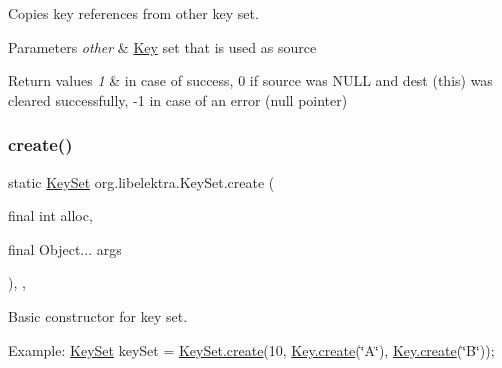 Copies key references from other key set. 


\begin{DoxyParams}{Parameters}
{\em other} & \mbox{\hyperlink{classorg_1_1libelektra_1_1Key}{Key}} set that is used as source \\
\hline
\end{DoxyParams}

\begin{DoxyRetVals}{Return values}
{\em 1} & in case of success, 0 if source was N\+U\+LL and dest (this) was cleared successfully, -\/1 in case of an error (null pointer) \\
\hline
\end{DoxyRetVals}
\mbox{\label{classorg_1_1libelektra_1_1KeySet_ae3f1cd9ac1a4fd2ef7d16e6c320bc6a3}} 
\subsubsection{\texorpdfstring{create()}{create()}\hspace{0.1cm}{\footnotesize\ttfamily [1/3]}}
{\footnotesize\ttfamily static \mbox{\hyperlink{classorg_1_1libelektra_1_1KeySet}{Key\+Set}} org.\+libelektra.\+Key\+Set.\+create (\begin{DoxyParamCaption}\item[{final int}]{alloc,  }\item[{final Object...}]{args }\end{DoxyParamCaption})\hspace{0.3cm}{\ttfamily [inline]}, {\ttfamily [static]}, {\ttfamily [protected]}}



Basic constructor for key set. 

Example\+: \mbox{\hyperlink{classorg_1_1libelektra_1_1KeySet}{Key\+Set}} key\+Set = \mbox{\hyperlink{classorg_1_1libelektra_1_1KeySet_ae3f1cd9ac1a4fd2ef7d16e6c320bc6a3}{Key\+Set.\+create}}(10, \mbox{\hyperlink{classorg_1_1libelektra_1_1Key_af407cf43625618af4e7fb2576037fcfc}{Key.\+create}}(\char`\"{}\+A\char`\"{}), \mbox{\hyperlink{classorg_1_1libelektra_1_1Key_af407cf43625618af4e7fb2576037fcfc}{Key.\+create}}(\char`\"{}\+B\char`\"{}));



